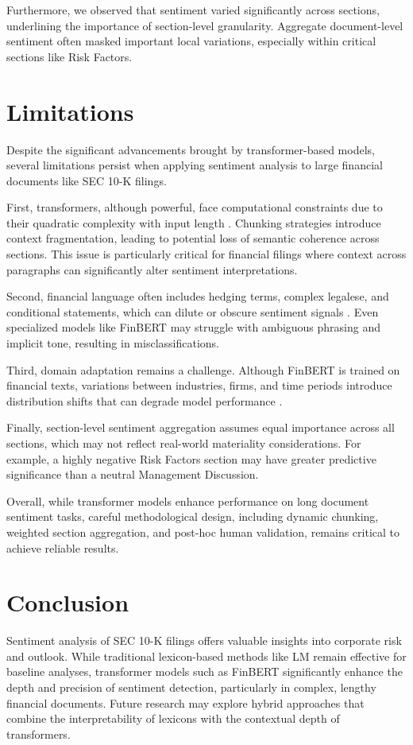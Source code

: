 \documentclass[12pt]{article}
\begin{document}
Furthermore, we observed that sentiment varied significantly across sections, underlining the importance of section-level granularity. Aggregate document-level sentiment often masked important local variations, especially within critical sections like Risk Factors.

\section{Limitations}
Despite the significant advancements brought by transformer-based models, several limitations persist when applying sentiment analysis to large financial documents like SEC 10-K filings.

First, transformers, although powerful, face computational constraints due to their quadratic complexity with input length \citep{Tay2020}. Chunking strategies introduce context fragmentation, leading to potential loss of semantic coherence across sections. This issue is particularly critical for financial filings where context across paragraphs can significantly alter sentiment interpretations.

Second, financial language often includes hedging terms, complex legalese, and conditional statements, which can dilute or obscure sentiment signals \citep{Loughran2011}. Even specialized models like FinBERT may struggle with ambiguous phrasing and implicit tone, resulting in misclassifications.

Third, domain adaptation remains a challenge. Although FinBERT is trained on financial texts, variations between industries, firms, and time periods introduce distribution shifts that can degrade model performance \citep{Huang2020}.

Finally, section-level sentiment aggregation assumes equal importance across all sections, which may not reflect real-world materiality considerations. For example, a highly negative Risk Factors section may have greater predictive significance than a neutral Management Discussion.

Overall, while transformer models enhance performance on long document sentiment tasks, careful methodological design, including dynamic chunking, weighted section aggregation, and post-hoc human validation, remains critical to achieve reliable results.

\section{Conclusion}
Sentiment analysis of SEC 10-K filings offers valuable insights into corporate risk and outlook. While traditional lexicon-based methods like LM remain effective for baseline analyses, transformer models such as FinBERT significantly enhance the depth and precision of sentiment detection, particularly in complex, lengthy financial documents. Future research may explore hybrid approaches that combine the interpretability of lexicons with the contextual depth of transformers.
\end{document}
